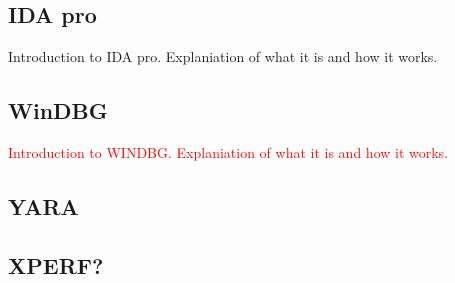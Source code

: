 \subsection{IDA pro}\label{IDA}
Introduction to IDA pro. Explaniation of what it is and how it works.
\subsection{WinDBG}
\textcolor{red}{Introduction to WINDBG. Explaniation of what it is and how it works.}
\subsection{YARA}
\subsection{XPERF? }
